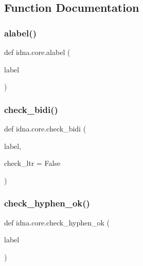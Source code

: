 \subsection{Function Documentation}
\mbox{\label{namespaceidna_1_1core_a86a57741e1e51a16d322b051c951ca40}} 
\subsubsection{\texorpdfstring{alabel()}{alabel()}}
{\footnotesize\ttfamily def idna.\+core.\+alabel (\begin{DoxyParamCaption}\item[{}]{label }\end{DoxyParamCaption})}

\mbox{\label{namespaceidna_1_1core_a08e1883cbe9b46e1a416180dfcfe5911}} 
\subsubsection{\texorpdfstring{check\+\_\+bidi()}{check\_bidi()}}
{\footnotesize\ttfamily def idna.\+core.\+check\+\_\+bidi (\begin{DoxyParamCaption}\item[{}]{label,  }\item[{}]{check\+\_\+ltr = {\ttfamily False} }\end{DoxyParamCaption})}

\mbox{\label{namespaceidna_1_1core_acb7767ca6cc614b38c8c2ecd9f696836}} 
\subsubsection{\texorpdfstring{check\+\_\+hyphen\+\_\+ok()}{check\_hyphen\_ok()}}
{\footnotesize\ttfamily def idna.\+core.\+check\+\_\+hyphen\+\_\+ok (\begin{DoxyParamCaption}\item[{}]{label }\end{DoxyParamCaption})}

